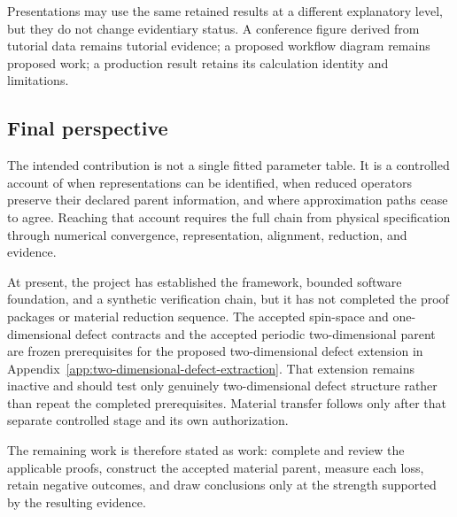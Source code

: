 Presentations may use the same retained results at a different explanatory
level, but they do not change evidentiary status. A conference figure derived
from tutorial data remains tutorial evidence; a proposed workflow diagram
remains proposed work; a production result retains its calculation identity and
limitations.

\subsection{Final perspective}

The intended contribution is not a single fitted parameter table. It is a
controlled account of when representations can be identified, when reduced
operators preserve their declared parent information, and where approximation
paths cease to agree. Reaching that account requires the full chain from
physical specification through numerical convergence, representation,
alignment, reduction, and evidence.

At present, the project has established the framework, bounded software
foundation, and a synthetic verification chain, but it has not completed the
proof packages or material reduction sequence. The accepted spin-space and
one-dimensional defect contracts and the accepted periodic two-dimensional
parent are frozen prerequisites for the proposed two-dimensional defect
extension in Appendix~\ref{app:two-dimensional-defect-extraction}. That
extension remains inactive and should test only genuinely two-dimensional
defect structure rather than repeat the completed prerequisites. Material
transfer follows only after that separate controlled stage and its own
authorization.

The remaining work is therefore stated as work: complete and review the
applicable proofs, construct the accepted material parent, measure each loss,
retain negative outcomes, and draw conclusions only at the strength supported
by the resulting evidence.
